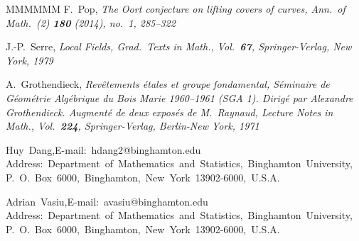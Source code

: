 \documentclass[11pt]{amsart}
\begin{document}
\begin{thebibliography}{MMMMMM}
 F.\ Pop,
\sl The Oort conjecture on lifting covers of curves,
\rm Ann.\ of Math.\ (2) {\bf 180} (2014), no.\ 1, 285--322

 J.-P.\ Serre,
\sl Local Fields,
\rm Grad.\ Texts in Math., Vol.\ {\bf 67}, Springer-Verlag, New York, 1979

 A.\ Grothendieck,
\sl Rev\^etements \'etales et groupe fondamental,
\rm Séminaire de Géométrie Algébrique du Bois Marie 1960–1961 (SGA 1). Dirigé par Alexandre Grothendieck. Augmenté de deux exposés de M.\ Raynaud, Lecture Notes in Math., Vol.\ {\bf 224}, Springer-Verlag, Berlin-New York, 1971

\end{thebibliography} 
\bigskip

\hbox{Huy Dang,\;\;\;E-mail: hdang2@binghamton.edu}
\hbox{Address: Department of Mathematics and Statistics, Binghamton University,}
\hbox{P. O. Box 6000, Binghamton, New York 13902-6000, U.S.A.}

\bigskip
\hbox{Adrian Vasiu,\;\;\;E-mail: avasiu@binghamton.edu}
\hbox{Address: Department of Mathematics and Statistics, Binghamton University,}
\hbox{P. O. Box 6000, Binghamton, New York 13902-6000, U.S.A.}
\end{document}
